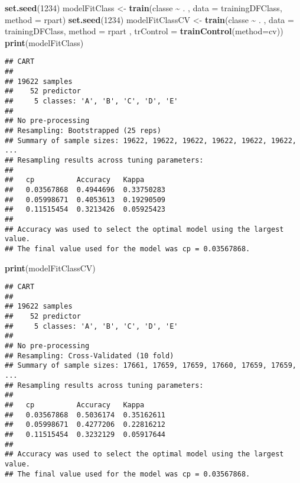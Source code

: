 \documentclass[
]{article}
\newenvironment{Shaded}{\begin{snugshade}}{\end{snugshade}}
\newcommand{\AttributeTok}[1]{\textcolor[rgb]{0.13,0.29,0.53}{#1}}
\newcommand{\DecValTok}[1]{\textcolor[rgb]{0.00,0.00,0.81}{#1}}
\newcommand{\FunctionTok}[1]{\textcolor[rgb]{0.13,0.29,0.53}{\textbf{#1}}}
\newcommand{\NormalTok}[1]{#1}
\newcommand{\OtherTok}[1]{\textcolor[rgb]{0.56,0.35,0.01}{#1}}
\newcommand{\SpecialCharTok}[1]{\textcolor[rgb]{0.81,0.36,0.00}{\textbf{#1}}}
\newcommand{\StringTok}[1]{\textcolor[rgb]{0.31,0.60,0.02}{#1}}
\begin{document}
\begin{Shaded}
\begin{Highlighting}[]
\FunctionTok{set.seed}\NormalTok{(}\DecValTok{1234}\NormalTok{)}
\NormalTok{modelFitClass }\OtherTok{\textless{}{-}} \FunctionTok{train}\NormalTok{(classe }\SpecialCharTok{\textasciitilde{}}\NormalTok{ . , }\AttributeTok{data =}\NormalTok{ trainingDFClass, }\AttributeTok{method =} \StringTok{\textquotesingle{}rpart\textquotesingle{}}\NormalTok{)}
\FunctionTok{set.seed}\NormalTok{(}\DecValTok{1234}\NormalTok{)}
\NormalTok{modelFitClassCV }\OtherTok{\textless{}{-}} \FunctionTok{train}\NormalTok{(classe }\SpecialCharTok{\textasciitilde{}}\NormalTok{ . , }\AttributeTok{data =}\NormalTok{ trainingDFClass, }\AttributeTok{method =} \StringTok{\textquotesingle{}rpart\textquotesingle{}}\NormalTok{ , }\AttributeTok{trControl =} \FunctionTok{trainControl}\NormalTok{(}\AttributeTok{method=}\StringTok{\textquotesingle{}cv\textquotesingle{}}\NormalTok{))}
\FunctionTok{print}\NormalTok{(modelFitClass)}
\end{Highlighting}
\end{Shaded}

\begin{verbatim}
## CART 
## 
## 19622 samples
##    52 predictor
##     5 classes: 'A', 'B', 'C', 'D', 'E' 
## 
## No pre-processing
## Resampling: Bootstrapped (25 reps) 
## Summary of sample sizes: 19622, 19622, 19622, 19622, 19622, 19622, ... 
## Resampling results across tuning parameters:
## 
##   cp          Accuracy   Kappa     
##   0.03567868  0.4944696  0.33750283
##   0.05998671  0.4053613  0.19290509
##   0.11515454  0.3213426  0.05925423
## 
## Accuracy was used to select the optimal model using the largest value.
## The final value used for the model was cp = 0.03567868.
\end{verbatim}

\begin{Shaded}
\begin{Highlighting}[]
\FunctionTok{print}\NormalTok{(modelFitClassCV)}
\end{Highlighting}
\end{Shaded}

\begin{verbatim}
## CART 
## 
## 19622 samples
##    52 predictor
##     5 classes: 'A', 'B', 'C', 'D', 'E' 
## 
## No pre-processing
## Resampling: Cross-Validated (10 fold) 
## Summary of sample sizes: 17661, 17659, 17659, 17660, 17659, 17659, ... 
## Resampling results across tuning parameters:
## 
##   cp          Accuracy   Kappa     
##   0.03567868  0.5036174  0.35162611
##   0.05998671  0.4277206  0.22816212
##   0.11515454  0.3232129  0.05917644
## 
## Accuracy was used to select the optimal model using the largest value.
## The final value used for the model was cp = 0.03567868.
\end{verbatim}
\end{document}
